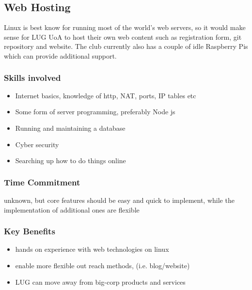 \subsection{Web Hosting}

Linux is best know for running most of the world's web servers, so it would make sense for LUG UoA to host their own web content such as registration form, git repository and website. The club currently also has a couple of idle Raspberry Pis which can provide additional support.

\subsubsection*{Skills involved}

\begin{itemize}
    \item Internet basics, knowledge of http, NAT, ports, IP tables etc
    \item Some form of server programming, preferably Node js
    \item Running and maintaining a database
    \item Cyber security
    \item Searching up how to do things online
\end{itemize}

\subsubsection*{Time Commitment}
unknown, but core features should be easy and quick to implement, while the implementation of additional ones are flexible

\subsubsection*{Key Benefits}
\begin{itemize}
    \item hands on experience with web technologies on linux
    \item enable more flexible out reach methods, (i.e. blog/website)
    \item LUG can move away from big-corp products and services
\end{itemize}